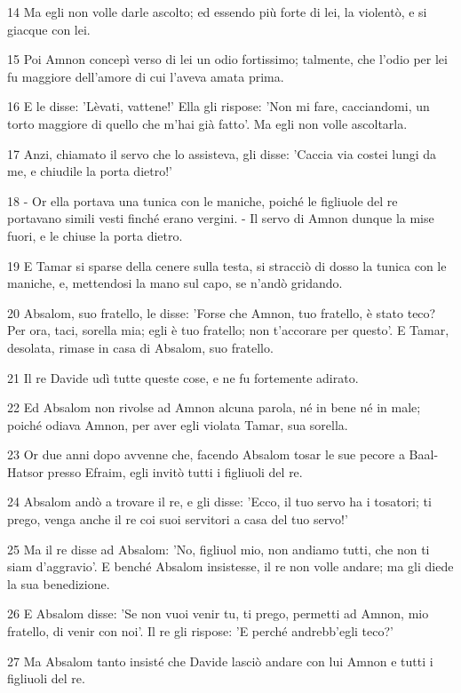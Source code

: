 \par 14 Ma egli non volle darle ascolto; ed essendo più forte di lei, la violentò, e si giacque con lei.
\par 15 Poi Amnon concepì verso di lei un odio fortissimo; talmente, che l'odio per lei fu maggiore dell'amore di cui l'aveva amata prima.
\par 16 E le disse: 'Lèvati, vattene!' Ella gli rispose: 'Non mi fare, cacciandomi, un torto maggiore di quello che m'hai già fatto'. Ma egli non volle ascoltarla.
\par 17 Anzi, chiamato il servo che lo assisteva, gli disse: 'Caccia via costei lungi da me, e chiudile la porta dietro!'
\par 18 - Or ella portava una tunica con le maniche, poiché le figliuole del re portavano simili vesti finché erano vergini. - Il servo di Amnon dunque la mise fuori, e le chiuse la porta dietro.
\par 19 E Tamar si sparse della cenere sulla testa, si stracciò di dosso la tunica con le maniche, e, mettendosi la mano sul capo, se n'andò gridando.
\par 20 Absalom, suo fratello, le disse: 'Forse che Amnon, tuo fratello, è stato teco? Per ora, taci, sorella mia; egli è tuo fratello; non t'accorare per questo'. E Tamar, desolata, rimase in casa di Absalom, suo fratello.
\par 21 Il re Davide udì tutte queste cose, e ne fu fortemente adirato.
\par 22 Ed Absalom non rivolse ad Amnon alcuna parola, né in bene né in male; poiché odiava Amnon, per aver egli violata Tamar, sua sorella.
\par 23 Or due anni dopo avvenne che, facendo Absalom tosar le sue pecore a Baal-Hatsor presso Efraim, egli invitò tutti i figliuoli del re.
\par 24 Absalom andò a trovare il re, e gli disse: 'Ecco, il tuo servo ha i tosatori; ti prego, venga anche il re coi suoi servitori a casa del tuo servo!'
\par 25 Ma il re disse ad Absalom: 'No, figliuol mio, non andiamo tutti, che non ti siam d'aggravio'. E benché Absalom insistesse, il re non volle andare; ma gli diede la sua benedizione.
\par 26 E Absalom disse: 'Se non vuoi venir tu, ti prego, permetti ad Amnon, mio fratello, di venir con noi'. Il re gli rispose: 'E perché andrebb'egli teco?'
\par 27 Ma Absalom tanto insisté che Davide lasciò andare con lui Amnon e tutti i figliuoli del re.
